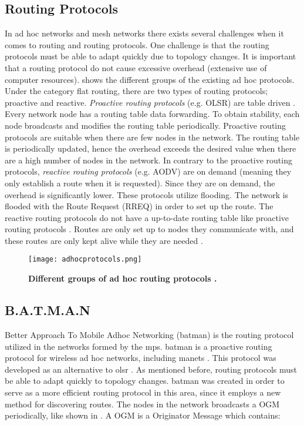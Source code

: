 \subsection{Routing Protocols}
In ad hoc networks and mesh networks there exists several challenges when it comes to routing and routing protocols. One challenge is that the routing protocols must be able to adapt quickly due to topology changes. It is important that a routing protocol do not cause excessive overhead (extensive use of computer resources).  shows the different groups of the existing ad hoc protocols. Under the category flat routing, there are two types of routing protocols; proactive and reactive. \textit{Proactive routing protocols} (e.g. OLSR) are table driven \citep{proactivereactive}. Every network node has a routing table data forwarding. To obtain stability, each node broadcasts and modifies the routing table periodically. Proactive routing protocols are suitable when there are few nodes in the network. The routing table is periodically updated, hence the overhead exceeds the desired value when there are a high number of nodes in the network. In contrary to the proactive routing protocols, \textit{reactive routing protocols} (e.g. AODV) are on demand (meaning they only establish a route when it is requested). Since they are on demand, the overhead is significantly lower. These protocols utilize flooding. The network is flooded with the Route Request (RREQ) in order to set up the route. The reactive routing protocols do not have a up-to-date routing table like proactive routing protocols \cite{proactivereactive}. Routes are only set up to nodes they communicate with, and these routes are only kept alive while they are needed  \cite{adhoc2}. 


\begin{figure}[t]
  \centering
    \texttt{[image: adhocprotocols.png]}
     \caption[Ad Hoc routing protocols]{\textbf{Different groups of ad hoc routing protocols \cite{adhoc}.}}
\label{fig:adhocprotocols}
\end{figure}


\subsection{B.A.T.M.A.N}
\label{subsec:batman}
Better Approach To Mobile Adhoc Networking (\gls{batman}) is the routing protocol utilized in the networks formed by the \glspl{mp}. \gls{batman} is a proactive routing protocol for wireless ad hoc networks, including \glspl{manet} \cite{batman}. This protocol was developed as an alternative to \gls{olsr} \cite{batman2}. As mentioned before, routing protocols must be able to adapt quickly to topology changes. \gls{batman} was created in order to serve as a more efficient routing protocol in this area, since it employs a new method for discovering routes. The nodes in the network broadcasts a OGM periodically, like shown in . A OGM is a Originator Message which contains: 

